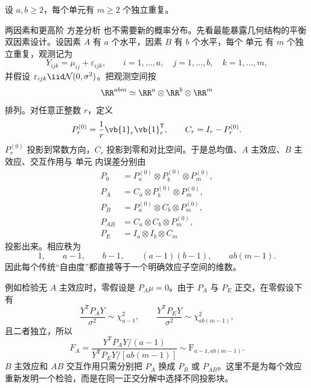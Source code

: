 \begin{theorem}
设 $a,b\ge2$，每个单元有 $m\ge2$ 个独立重复。


两因素和更高阶 方差分析 也不需要新的概率分布。先看最能暴露几何结构的平衡双因素设计。设因素 $A$ 有 $a$ 个水平，因素 $B$ 有 $b$ 个水平，每个 单元 有 $m$ 个独立重复，观测记为
\[
 Y_{ijk}=\mu_{ij}+\varepsilon_{ijk},
 \qquad
 i=1,\ldots,a,
 \quad
 j=1,\ldots,b,
 \quad
 k=1,\ldots,m,
\]
并假设 $\varepsilon_{ijk}\iid\mathcal N(0,\sigma^2)$。把观测空间按
\[
 \RR^{abm}
 \simeq
 \RR^a\otimes\RR^b\otimes\RR^m
\]
排列。对任意正整数 $r$，定义
\[
 P_r^{(0)}=\frac1r\vb{1}_r\vb{1}_r^{\mathsf T},
 \qquad
 C_r=I_r-P_r^{(0)}.
\]
$P_r^{(0)}$ 投影到常数方向，$C_r$ 投影到零和对比空间。于是总均值、$A$ 主效应、$B$ 主效应、交互作用与 单元 内误差分别由
\begin{align*}
 P_0&=P_a^{(0)}\otimes P_b^{(0)}\otimes P_m^{(0)},\\
 P_A&=C_a\otimes P_b^{(0)}\otimes P_m^{(0)},\\
 P_B&=P_a^{(0)}\otimes C_b\otimes P_m^{(0)},\\
 P_{AB}&=C_a\otimes C_b\otimes P_m^{(0)},\\
 P_E&=I_a\otimes I_b\otimes C_m
\end{align*}
投影出来。相应秩为
\[
 1,
 \qquad
 a-1,
 \qquad
 b-1,
 \qquad
 (a-1)(b-1),
 \qquad
 ab(m-1).
\]
因此每个传统“自由度”都直接等于一个明确效应子空间的维数。

例如检验无 $A$ 主效应时，零假设是 $P_A\mu=0$。由于 $P_A$ 与 $P_E$ 正交，在零假设下有
\[
 \frac{Y^{\mathsf T}P_AY}{\sigma^2}\sim\chi^2_{a-1},
 \qquad
 \frac{Y^{\mathsf T}P_EY}{\sigma^2}\sim\chi^2_{ab(m-1)},
\]
且二者独立，所以
\begin{equation}\label{eq:math-stat-balanced-two-way-anova-f}
 F_A
 =\frac{Y^{\mathsf T}P_AY/(a-1)}
 {Y^{\mathsf T}P_EY/[ab(m-1)]}
 \sim\mathrm F_{a-1,ab(m-1)}.
\end{equation}
$B$ 主效应和 $AB$ 交互作用只需分别把 $P_A$ 换成 $P_B$ 或 $P_{AB}$。这里不是为每个效应重新发明一个检验，而是在同一正交分解中选择不同投影块。
\end{theorem}

